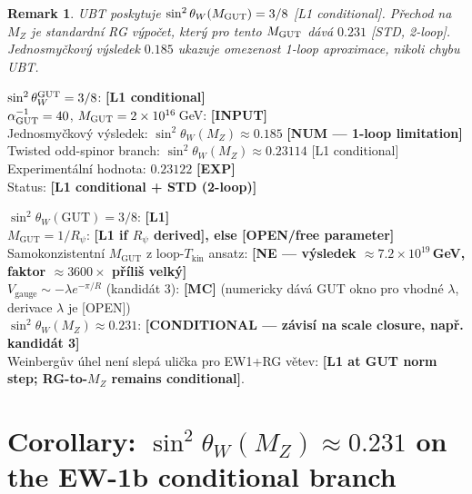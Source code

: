 \documentclass[12pt,a4paper]{article}
\newtheorem{remark}[proposition]{Remark}
\begin{document}
\begin{remark}
UBT poskytuje $\sin^2\theta_W(M_{\rm GUT})=3/8$ [L1 conditional].
Přechod na $M_Z$ je standardní RG výpočet, který pro tento
$M_{\rm GUT}$ dává $0.231$ [STD, 2-loop].
Jednosmyčkový výsledek $0.185$ ukazuje \emph{omezenost 1-loop
aproximace}, nikoli chybu UBT.
\end{remark}

\begin{statusbox}
$\sin^2\theta_W^{\rm GUT}=3/8$: \textbf{[L1 conditional]}\\
$\alpha_{\rm GUT}^{-1}=40$, $M_{\rm GUT}=2\times10^{16}$\,GeV: \textbf{[INPUT]}\\
Jednosmyčkový výsledek: $\sin^2\theta_W(M_Z)\approx 0.185$ \textbf{[NUM — 1-loop limitation]}\\
Twisted odd-spinor branch: $\sin^2\theta_W(M_Z)\approx0.23114$ [L1 conditional]\\
Experimentální hodnota: $0.23122$ \textbf{[EXP]}\\
Status: \textbf{[L1 conditional + STD (2-loop)]}
\end{statusbox}

\begin{tcolorbox}[title={Weinberg angle — Verdikt}]
$\sin^2\theta_W(\mathrm{GUT})=3/8$: \textbf{[L1]}\\
$M_{\mathrm{GUT}}=1/R_\psi$: \textbf{[L1 if $R_\psi$ derived], else [OPEN/free parameter]}\\
Samokonzistentní $M_{\mathrm{GUT}}$ z loop-$T_{\mathrm{kin}}$ ansatz: \textbf{[NE — výsledek $\approx7.2\times10^{19}$\,GeV, faktor $\approx3600\times$ příliš velký]}\\
$V_{\mathrm{gauge}}\sim-\lambda e^{-\pi/R}$ (kandidát 3): \textbf{[MC]} (numericky dává GUT okno pro vhodné $\lambda$, derivace $\lambda$ je [OPEN])\\
$\sin^2\theta_W(M_Z)\approx0.231$: \textbf{[CONDITIONAL — závisí na scale closure, např. kandidát 3]}\\
Weinbergův úhel není slepá ulička pro EW1+RG větev: \textbf{[L1 at GUT norm step; RG-to-$M_Z$ remains conditional]}.
\end{tcolorbox}

\section{Corollary: $\sin^2\theta_W(M_Z)\approx 0.231$ on the EW-1b conditional branch}
\label{sec:corollary_sw}
\end{document}
